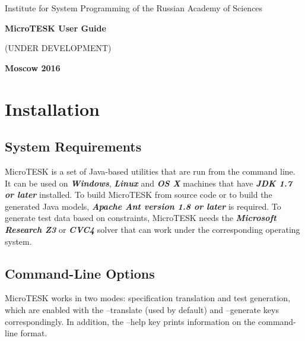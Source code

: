 \documentclass[oneside,final,14pt]{extreport}
\begin{document}
\begin{titlepage}
\begin{center}
\Large{Institute for System Programming of the Russian Academy of Sciences}

\vfill


\bf\Large{MicroTESK User Guide}

(UNDER DEVELOPMENT)

\vfill

\bf
Moscow 2016
\end{center}
\end{titlepage}


\newpage
{} %
\tableofcontents


\chapter{Installation}

\section{System Requirements}

MicroTESK is a set of Java-based utilities that are run from the command line.
It can be used on \textbf{\textit{Windows}}, \textbf{\textit{Linux}} and
\textbf{\textit{OS X}} machines that have \textbf{\textit{JDK 1.7 or later}}
installed. To build MicroTESK from source code or to build the generated
Java models, \textbf{\textit{Apache Ant version 1.8 or later}} is required.
To generate test data based on constraints, MicroTESK needs
the \textbf{\textit{Microsoft Research Z3}} or \textbf{\textit{CVC4}} solver that
can work under the corresponding operating system.

\section{Command-Line Options}

MicroTESK works in two modes: specification translation and test generation,
which are enabled with the --translate (used by default) and --generate keys
correspondingly. In addition, the --help key prints information on the command-line format.
\end{document}
